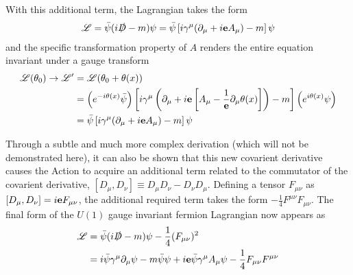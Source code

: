     With this additional term, the Lagrangian takes the form
    \begin{equation} \begin{split}
    \mathscr{L} = \bar{\psi} (i\slashed{D} - m) \psi
        = \bar{\psi} \left[i\gamma^\mu(\partial_\mu + i \mathbf{e} A_\mu) - m\right] \psi
    \end{split} \end{equation}
    and the specific transformation property of $A$ renders the entire equation invariant under a gauge transform
    \begin{equation} \begin{split}
    \mathscr{L}(\theta_0) \to \mathscr{L}' &= \mathscr{L}(\theta_0+\theta(x))
        \\&= \left( e^{-i\theta(x)} \bar{\psi} \right) 
        \left[i\gamma^\mu \left(\partial_\mu 
            + i \mathbf{e} \left[A_\mu - \frac{1}{\mathbf{e}} \partial_\mu \theta(x)\right] \right) 
            - m\right]
        \left( e^{i\theta(x)}\psi \right)
        \\&= \bar{\psi} \left[i\gamma^\mu(\partial_\mu + i \mathbf{e} A_\mu) - m\right] \psi
    \end{split} \end{equation}

    Through a subtle and much more complex derivation (which will not be demonstrated here),
        it can also be shown that this new covarient derivative causes the Action to acquire an additional term 
        related to the commutator of the covarient derivative, $[D_\mu, D_\nu] \equiv D_\mu D_\nu - D_\nu D_\mu$.
    Defining a tensor $F_{\mu\nu}$ as $[D_\mu, D_\nu] = i\mathbf{e} F_{\mu\nu}$,
        the additional required term takes the form $-\frac{1}{4}F^{\mu\nu}F_{\mu\nu}$.
    The final form of the $U(1)$ gauge invariant fermion Lagrangian now appears as
    \begin{equation} \label{eq:qedL} \begin{split}
        \mathscr{L} &= \bar{\psi} (i\slashed{D} - m) \psi - \frac{1}{4}(F_{\mu\nu})^2
        \\&= i \bar{\psi} \gamma^\mu \partial_\mu \psi
            - m \bar{\psi} \psi
            + i \mathbf{e} \bar{\psi} \gamma^\mu A_\mu \psi
            - \frac{1}{4}F_{\mu\nu}F^{\mu\nu}
    \end{split} \end{equation}

